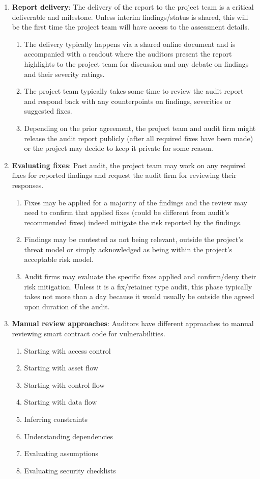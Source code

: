 \begin{enumerate}
\item\textbf{Report delivery}: The delivery of the report to the project team is a critical deliverable and milestone. Unless interim findings/status is shared, this will be the first time the project team will have access to the assessment details.
	\begin{enumerate}
	\item The delivery typically happens via a shared online document and is accompanied with a readout where the auditors present the report highlights to the project team for discussion and any debate on findings and their severity ratings.
	\item The project team typically takes some time to review the audit report and respond back with any counterpoints on findings, severities or suggested fixes.
	\item Depending on the prior agreement, the project team and audit firm might release the audit report publicly (after all required fixes have been made) or the project may decide to keep it private for some reason.
	\end{enumerate}

\item\textbf{Evaluating fixes}: Post audit, the project team may work on any required fixes for reported findings and request the audit firm for reviewing their responses.
	\begin{enumerate}
	\item Fixes may be applied for a majority of the findings and the review may need to confirm that applied fixes (could be different from audit’s recommended fixes) indeed mitigate the risk reported by the findings.
	\item Findings may be contested as not being relevant, outside the project’s threat model or simply acknowledged as being within the project’s acceptable risk model.
	\item Audit firms may evaluate the specific fixes applied and confirm/deny their risk mitigation. Unless it is a fix/retainer type audit, this phase typically takes not more than a day because it would usually be outside the agreed upon duration of the audit.
	\end{enumerate}

\item\textbf{Manual review approaches}: Auditors have different approaches to manual reviewing smart contract code for vulnerabilities.
	\begin{enumerate}
	\item Starting with access control
	\item Starting with asset flow
	\item Starting with control flow
	\item Starting with data flow
	\item Inferring constraints
	\item Understanding dependencies
	\item Evaluating assumptions
	\item Evaluating security checklists
	\end{enumerate}


\end{enumerate}

